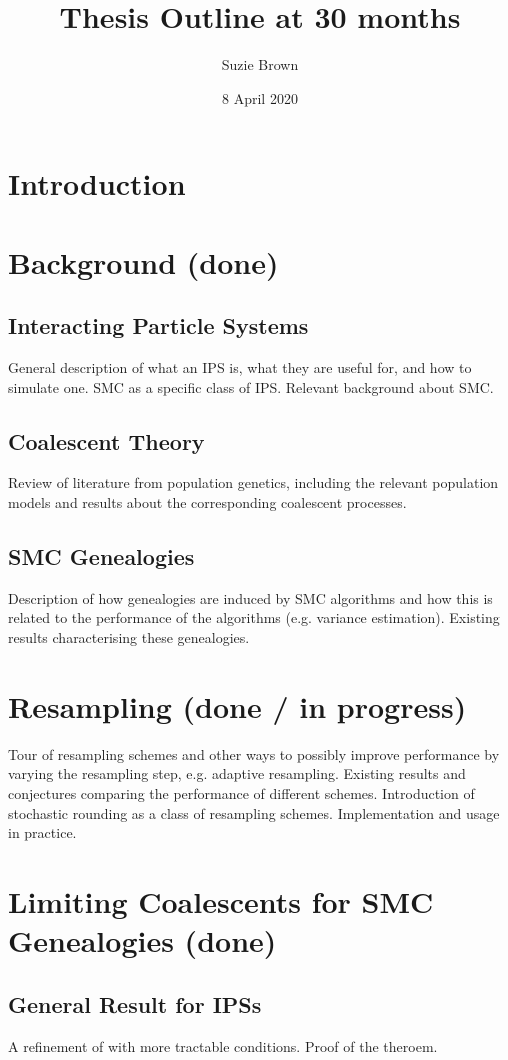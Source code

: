 \documentclass{article}
\title{Thesis Outline at 30 months}
\author{Suzie Brown}
\date{8 April 2020}
\begin{document}
\maketitle

\section{Introduction}

\section{Background (done)}
\subsection{Interacting Particle Systems}
General description of what an IPS is, what they are useful for, and how to simulate one. SMC as a specific class of IPS. Relevant background about SMC.
\subsection{Coalescent Theory}
Review of literature from population genetics, including the relevant population models and results about the corresponding coalescent processes.
\subsection{SMC Genealogies}
Description of how genealogies are induced by SMC algorithms and how this is related to the performance of the algorithms (e.g. variance estimation). Existing results characterising these genealogies.

\section{Resampling (done / in progress)} %
Tour of resampling schemes and other ways to possibly improve performance by varying the resampling step, e.g. adaptive resampling. Existing results and conjectures comparing the performance of different schemes. Introduction of stochastic rounding as a class of resampling schemes. Implementation and usage in practice. 

\section{Limiting Coalescents for SMC Genealogies (done)}
\subsection{General Result for IPSs}
A refinement of \citet[Theorem 1]{koskela2018} with more tractable conditions. Proof of the theroem. 
\end{document}
